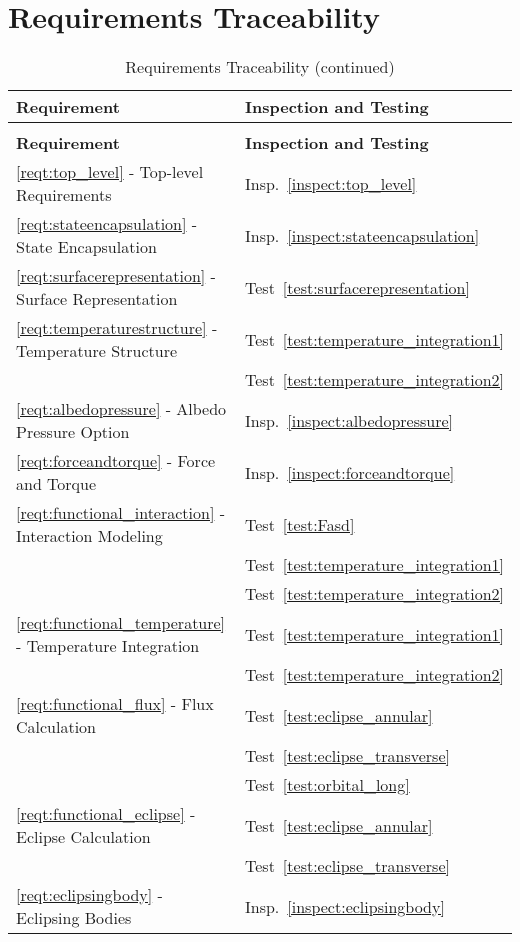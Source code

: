 \section{Requirements Traceability}\label{sec:traceability}

\begin{longtable}[c]{||p{3in}|p{3in}|}
\caption{Requirements Traceability} \\[6pt]
\hline
{\bf Requirement} & {\bf Inspection and Testing} \\ 
\hline \hline
\endfirsthead
\hline
\endfoot
\caption[]{Requirements Traceability (continued)} \\[6pt]
\hline
{\bf Requirement} & {\bf Inspection and Testing} \\ 
\hline \hline
\endhead
\ref{reqt:top_level} - Top-level Requirements &
  Insp.~\ref{inspect:top_level} \\ \hline

\ref{reqt:stateencapsulation} -  State Encapsulation
& Insp.~\ref{inspect:stateencapsulation} \\ \hline

\ref{reqt:surfacerepresentation} -  Surface Representation
& Test~\ref{test:surfacerepresentation} \\ \hline

\ref{reqt:temperaturestructure} -  Temperature Structure
& Test~\ref{test:temperature_integration1} \\
& Test~\ref{test:temperature_integration2} \\ \hline

\ref{reqt:albedopressure} -  Albedo Pressure Option
& Insp.~\ref{inspect:albedopressure} \\ \hline

\ref{reqt:forceandtorque} -  Force and Torque
& Insp.~\ref{inspect:forceandtorque} \\ \hline

\ref{reqt:functional_interaction} -  Interaction Modeling
& Test~\ref{test:Fasd} \\
& Test~\ref{test:temperature_integration1} \\
& Test~\ref{test:temperature_integration2} \\ \hline

\ref{reqt:functional_temperature} -  Temperature Integration
& Test~\ref{test:temperature_integration1} \\
& Test~\ref{test:temperature_integration2} \\ \hline

\ref{reqt:functional_flux} -  Flux Calculation
& Test~\ref{test:eclipse_annular} \\
& Test~\ref{test:eclipse_transverse} \\
& Test~\ref{test:orbital_long} \\ \hline

\ref{reqt:functional_eclipse} - Eclipse Calculation 
& Test~\ref{test:eclipse_annular} \\
& Test~\ref{test:eclipse_transverse} \\ \hline

\ref{reqt:eclipsingbody} -  Eclipsing Bodies
& Insp.~\ref{inspect:eclipsingbody} \\ \hline

\end{longtable}
